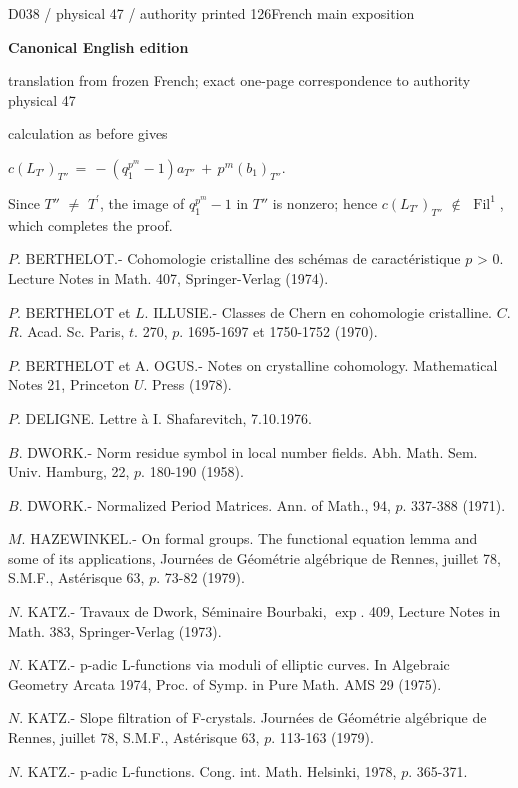 \documentclass[9pt]{article}
\newcommand{\CanonHeading}[1]{\par\vspace{1.5pt}{\fontsize{8.6}{10.0}\selectfont\sffamily\bfseries\color{Accent} #1\par}\vspace{1.5pt}}
\newcommand{\CanonText}[1]{\par{\fontsize{8.0}{9.35}\selectfont\RaggedRight #1\par}\vspace{2.2pt}}
\newcommand{\CanonDisplay}[1]{\par\vspace{1.2pt}\begin{center}{\fontsize{7.2}{8.4}\selectfont\(\displaystyle #1\)}\end{center}\vspace{1.2pt}}
\newcommand{\LayerTitle}{Canonical English edition}
\begin{document}
\noindent\begin{minipage}[t][\dimexpr\textheight-5pt\relax][t]{\textwidth}
{\sffamily\fontsize{7.3}{8.2}\selectfont\color{Quiet} D038 / physical 47 / authority printed 126\hfill French main exposition}
\par{}\vspace{4.5pt}
{\sffamily\fontsize{10.4}{11.6}\selectfont\bfseries\color{Accent} \LayerTitle}
\par{\sffamily\fontsize{6.7}{7.7}\selectfont\color{Quiet} translation from frozen French; exact one-page correspondence to authority physical 47}
\vspace{5pt}
\CanonText{calculation as before gives}
\CanonDisplay{c(L_{T'})_{T''}\,=\,-(q_{1}^{p^{m}}-1)a_{T''}\,+\,p^{m}(b_{1})_{T''}.}
\CanonText{Since \(T''\) \(\neq{}\) \(T^{\prime}\), the image of \(q_{1}^{p^{m}}-1\) in \(T''\) is nonzero; hence \(c(L_{T'})_{T''}\) \(\notin{}\) \(\operatorname{Fil}^{1}\), which completes the proof.}
\CanonHeading{BIBLIOGRAPHY}
\CanonText{[1] \(P\). BERTHELOT.- Cohomologie cristalline des schémas de caractéristique \(p\) > 0. Lecture Notes in Math. 407, Springer-Verlag (1974).}
\CanonText{[2] \(P\). BERTHELOT et \(L\). ILLUSIE.- Classes de Chern en cohomologie cristalline. \(C\). \(R\). Acad. Sc. Paris, \(t\). 270, \(p\). 1695-1697 et 1750-1752 (1970).}
\CanonText{[3] \(P\). BERTHELOT et A. OGUS.- Notes on crystalline cohomology. Mathematical Notes 21, Princeton \(U\). Press (1978).}
\CanonText{[4] \(P\). DELIGNE. Lettre à I. Shafarevitch, 7.10.1976.}
\CanonText{[5] \(B\). DWORK.- Norm residue symbol in local number fields. Abh. Math. Sem. Univ. Hamburg, 22, \(p\). 180-190 (1958).}
\CanonText{[6] \(B\). DWORK.- Normalized Period Matrices. Ann. of Math., 94, \(p\). 337-388 (1971).}
\CanonText{[7] \(M\). HAZEWINKEL.- On formal groups. The functional equation lemma and some of its applications, Journées de Géométrie algébrique de Rennes, juillet 78, S.M.F., Astérisque 63, \(p\). 73-82 (1979).}
\CanonText{[8] \(N\). KATZ.- Travaux de Dwork, Séminaire Bourbaki, \(\operatorname{exp}\). 409, Lecture Notes in Math. 383, Springer-Verlag (1973).}
\CanonText{[9] \(N\). KATZ.- p-adic L-functions via moduli of elliptic curves. In Algebraic Geometry Arcata 1974, Proc. of Symp. in Pure Math. AMS 29 (1975).}
\CanonText{[10] \(N\). KATZ.- Slope filtration of F-crystals. Journées de Géométrie algébrique de Rennes, juillet 78, S.M.F., Astérisque 63, \(p\). 113-163 (1979).}
\CanonText{[11] \(N\). KATZ.- p-adic L-functions. Cong. int. Math. Helsinki, 1978, \(p\). 365-371.}

\end{minipage}
\end{document}
